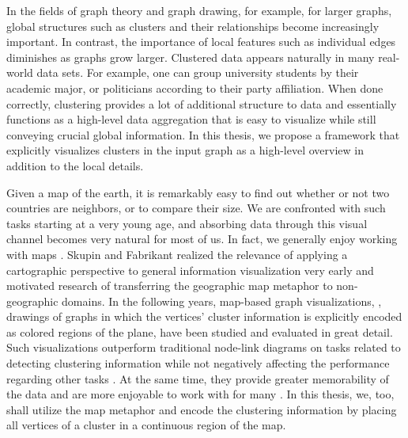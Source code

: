 \label{sect:motivation}

In the fields of graph theory and graph drawing, for example, for larger graphs, global structures such as clusters and their relationships become increasingly important.
In contrast, the importance of local features such as individual edges diminishes as graphs grow larger.
Clustered data appears naturally in many real-world data sets.
For example, one can group university students by their academic major, or politicians according to their party affiliation. 
When done correctly, clustering provides a lot of additional structure to data and essentially functions as a high-level data aggregation that is easy to visualize while still conveying crucial global information.
In this thesis, we propose a framework that explicitly visualizes clusters in the input graph as a high-level overview in addition to the local details.

Given a map of the earth, it is remarkably easy to find out whether or not two countries are neighbors, or to compare their size.
We are confronted with such tasks starting at a very young age, and absorbing data through this visual channel becomes very natural for most of us.
In fact, we generally enjoy working with maps \cite{saket2016comparing}.
Skupin and Fabrikant \cite{skupin2003spatialization} realized the relevance of applying a cartographic perspective to general information visualization very early and motivated research of transferring the geographic map metaphor to non-geographic domains.
In the following years, map-based graph visualizations, \ie{}, drawings of graphs in which the vertices' cluster information is explicitly encoded as colored regions of the plane, have been studied and evaluated in great detail.
Such visualizations outperform traditional node-link diagrams on tasks related to detecting clustering information while not negatively affecting the performance regarding other tasks \cite{saket2014node}. At the same time, they provide greater memorability of the data \cite{saket2015map} and are more enjoyable to work with for many \cite{saket2016comparing}.
In this thesis, we, too, shall utilize the map metaphor and encode the clustering information by placing all vertices of a cluster in a continuous region of the map.

